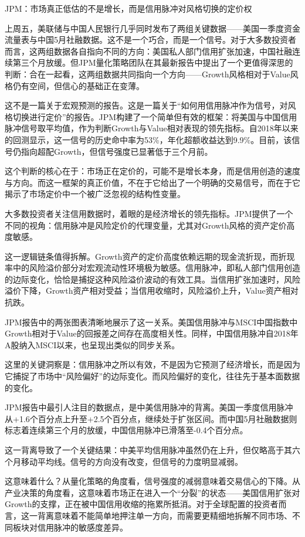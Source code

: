 \documentclass[11pt]{ctexart}
\begin{document}
JPM：市场真正低估的不是增长，而是信用脉冲对风格切换的定价权

上周五，美联储与中国人民银行几乎同时发布了两组关键数据——美国一季度资金流量表与中国5月社融数据。这不是一个巧合，而是一个信号。对于大多数投资者而言，这两组数据各自指向不同的方向：美国私人部门信用扩张加速，中国社融连续第三个月放缓。但JPM量化策略团队在其最新报告中提出了一个更值得深思的判断：合在一起看，这两组数据共同指向一个方向——Growth风格相对于Value风格仍有空间，但信心的基础正在变薄。

这不是一篇关于宏观预测的报告。这是一篇关于“如何用信用脉冲作为信号，对风格切换进行定价”的报告。JPM构建了一个简单但有效的框架：将美国与中国信用脉冲信号取平均值，作为判断Growth与Value相对表现的领先指标。自2018年以来的回测显示，这一信号的历史命中率为53\%，年化超额收益达到9.9\%。目前，该信号仍指向超配Growth，但信号强度已显著低于三个月前。

这个判断的核心在于：市场正在定价的，可能不是增长本身，而是信用创造的速度与方向。而这一框架的真正价值，不在于它给出了一个明确的交易信号，而在于它揭示了市场定价中一个被广泛忽视的结构性变量。

大多数投资者关注信用数据时，着眼的是经济增长的领先指标。JPM提供了一个不同的视角：信用脉冲是风险定价的代理变量，尤其对Growth风格的资产定价高度敏感。

这一逻辑链条值得拆解。Growth资产的定价高度依赖远期的现金流折现，而折现率中的风险溢价部分对宏观流动性环境极为敏感。信用脉冲，即私人部门信用创造的边际变化，恰恰是捕捉这种风险溢价波动的有效工具。当信用扩张加速时，风险溢价下降，Growth资产相对受益；当信用收缩时，风险溢价上升，Value资产相对抗跌。

JPM报告中的两张图表清晰地展示了这一关系。美国信用脉冲与MSCI中国指数中Growth相对于Value的回报差之间存在高度相关性。同样，中国信用脉冲自2018年A股纳入MSCI以来，也呈现出类似的同步关系。

这里的关键洞察是：信用脉冲之所以有效，不是因为它预测了经济增长，而是因为它捕捉了市场中“风险偏好”的边际变化。而风险偏好的变化，往往先于基本面数据的变化。

JPM报告中最引人注目的数据点，是中美信用脉冲的背离。美国一季度信用脉冲从+1.6个百分点上升至+2.5个百分点，继续处于扩张区间。而中国5月社融数据则标志着连续第三个月的放缓，中国信用脉冲已滑落至-0.4个百分点。

这一背离导致了一个关键结果：中美平均信用脉冲虽然仍在上升，但仅略高于其六个月移动平均线。信号的方向没有改变，但信号的力度明显减弱。

这意味着什么？从量化策略的角度看，信号强度的减弱意味着交易信心的下降。从产业决策的角度看，这意味着市场正在进入一个“分裂”的状态——美国信用扩张对Growth的支撑，正在被中国信用收缩的拖累所抵消。对于全球配置的投资者而言，这一背离意味着不能简单地押注单一方向，而需要更精细地拆解不同市场、不同板块对信用脉冲的敏感度差异。
\end{document}
